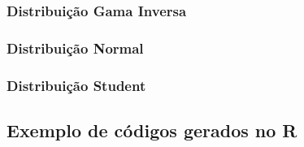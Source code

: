 \subsubsection{Distribuição Gama Inversa}

\subsubsection{Distribuição Normal}

\subsubsection{Distribuição Student}

\subsection{Exemplo de códigos gerados no R}



